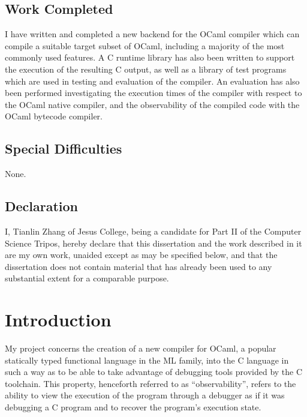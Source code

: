 \documentclass[12pt,a4paper,twoside,openright]{report}
\begin{document}
\section*{Work Completed}

I have written and completed a new backend for the OCaml compiler which can
compile a suitable target subset of OCaml, including a majority of the most
commonly used features. A C runtime library has also been written to support the
execution of the resulting C output, as well as a library of test programs which
are used in testing and evaluation of the compiler. An evaluation has also been
performed investigating the execution times of the compiler with respect to the
OCaml native compiler, and the observability of the compiled code with the OCaml
bytecode compiler.

\section*{Special Difficulties}

None.
 
\newpage
\section*{Declaration}

I, Tianlin Zhang of Jesus College, being a candidate for Part II of the Computer
Science Tripos, hereby declare
that this dissertation and the work described in it are my own work,
unaided except as may be specified below, and that the dissertation
does not contain material that has already been used to any substantial
extent for a comparable purpose.

\bigskip
{}

\medskip
{}

\tableofcontents


\pagestyle{headings}

\chapter{Introduction}

My project concerns the creation of a new compiler for OCaml, a popular
statically typed functional language in the ML family, into the C language in
such a way as to be able to take advantage of debugging tools provided by the C
toolchain. This property, henceforth referred to as ``observability'', refers to
the ability to view the execution of the program through a debugger as if it was
debugging a C program and to recover the program's execution state.
\end{document}
